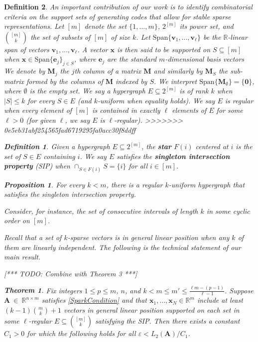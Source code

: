 \documentclass[9pt,twocolumn]{pnas-new}
\newtheorem{theorem}{Theorem}
\newtheorem{proposition}{Proposition}
\newtheorem{definition}{Definition}
\begin{document}
\begin{definition}
An important contribution of our work is to identify combinatorial criteria on the support sets of generating codes that allow for stable sparse 
representations.  Let $[m]$ denote the set $\{1, \ldots, m\}$, $2^{[m]}$ its power set, and ${[m] \choose k}$ the set of subsets of $[m]$ of size $k$. Let $\text{Span}\{\mathbf{v}_1, \ldots, \mathbf{v}_\ell\}$ be the $\mathbb{R}$-linear span of vectors $\mathbf{v}_1, \ldots, \mathbf{v}_\ell$. A vector $\mathbf{x}$ is then said to be \emph{supported} on $S \subseteq [m]$ when $\mathbf{x} \in \text{Span} \{\mathbf{e}_j\}_{j\in S}$, where $\mathbf{e}_j$ are the standard $m$-dimensional basis vectors We denote by $\mathbf{M}_j$ the $j$th column of a matrix $\mathbf{M}$ and similarly by $\mathbf{M}_S$ the sub-matrix formed by the columns of $\mathbf{M}$ indexed by $S$. We interpret $\text{Span}\{\mathbf{M}_\emptyset\} = \{\textbf{0}\}$, where $\emptyset$ is the empty set. We say a hypergraph $E \subseteq 2^{[m]}$ is of rank $k$ when $|S| \leq k$ for every $S \in E$ (and $k$-uniform when equality holds). We say $E$ is \emph{regular} when every element of $[m]$ is contained in exactly $\ell$ elements of $E$ for some $\ell > 0$ (for given $\ell$, we say $E$ is $\ell$-regular).
>>>>>>> 0e5eb31abf254565fad6719295fa0acc30f8ddff

\begin{definition}
Given a hypergraph $E \subseteq 2^{[m]}$, the \textbf{star} $F(i)$ centered at $i$ is the set of $S \in E$ containing $i$. We say $E$ satisfies the \textbf{singleton intersection property} (SIP) when $\cap_{S \in F(i)} S = \{i\}$ for all $i \in [m]$. 
\end{definition}

\begin{proposition}
For every $k < m$, there is a regular $k$-uniform hypergraph that satisfies the singleton intersection property.
\end{proposition}
Consider, for instance, the set of consecutive intervals of length $k$ in some cyclic order on $[m]$.

Recall that a set of $k$-sparse vectors is in \emph{general linear position} when any $k$ of them are linearly independent.
The following is the technical statement of our main result. 

[*** TODO: Combine with Theorem 3 ***]
\begin{theorem}\label{DeterministicUniquenessTheorem}
Fix integers $1 \leq p \leq m$, $n$, and $k < m \leq m' \leq \frac{\ell m - (p-1)}{\ell - 1}$. Suppose $\mathbf{A}~\in~\mathbb{R}^{n \times m}$ satisfies \eqref{SparkCondition} and that \mbox{$\mathbf{x}_1, \ldots, \mathbf{x}_N \in \mathbb{R}^m$} include at least \mbox{$(k-1){m \choose k}+1$} vectors in general linear position supported on each set in some $\ell$-regular $E \subseteq {[m] \choose k}$ satisfying the SIP. Then there exists a constant $C_1 > 0$ for which the following holds for all $\varepsilon < L_2(\mathbf{A}) / C_1$. %


\end{theorem}
\end{definition}
\end{document}
